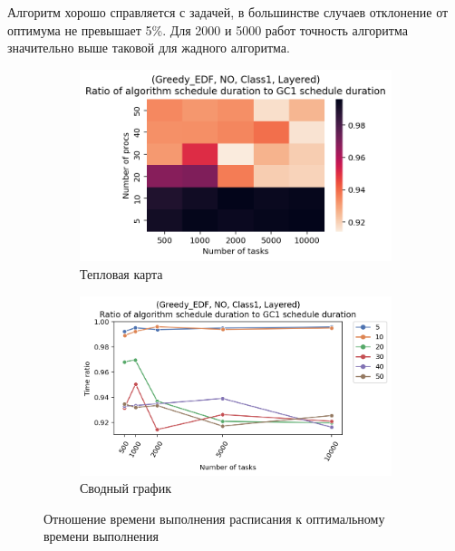 Алгоритм хорошо справляется с задачей, в большинстве случаев отклонение от оптимума не превышает 5\%. Для 2000 и 5000 работ точность алгоритма значительно выше таковой для жадного алгоритма.

\begin{figure}[!htbp]
    \centering
    \begin{subfigure}{0.49\textwidth}
        \includegraphics[width=\textwidth]{imgs/layered_class_1/NO_EDF/times.png}
        \caption{Тепловая карта}
        \label{fig:NO-layered-EDF-times-heatmap}
    \end{subfigure}
    \hfill
    \begin{subfigure}{0.49\textwidth}
        \includegraphics[width=\textwidth]{imgs/layered_class_1/NO_EDF/gr_amalgamated.png}
        \caption{Сводный график} 
        \label{fig:NO-layered-EDF-times-compiled}
    \end{subfigure}
    \caption{Отношение времени выполнения расписания к оптимальному времени выполнения}
\end{figure}

